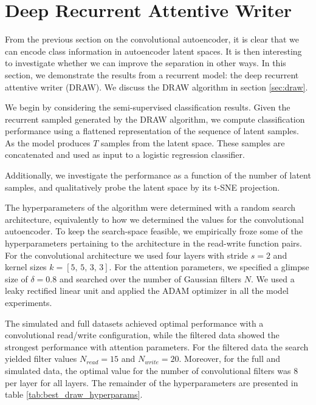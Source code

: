 \section{Deep Recurrent Attentive Writer }

From the previous section on the convolutional autoencoder, it is clear that we can encode class information in autoencoder latent spaces. It is then interesting to investigate whether we can improve the separation in other ways. In this section, we demonstrate the results from a recurrent model: the deep recurrent attentive writer (DRAW). We discuss the DRAW algorithm in section \ref{sec:draw}.

We begin by considering the semi-supervised classification results. Given the recurrent sampled generated by the DRAW algorithm, we compute classification performance using a flattened representation of the sequence of latent samples. As the model produces $T$ samples from the latent space. These samples are concatenated and used as input to a logistic regression classifier.

Additionally, we investigate the performance as a function of the number of latent samples, and qualitatively probe the latent space by its t-SNE projection.

The hyperparameters of the algorithm were determined with a random search architecture, equivalently to how we determined the values for the convolutional autoencoder. To keep the search-space feasible, we empirically froze some of the hyperparameters pertaining to the architecture in the read-write function pairs. For the convolutional architecture we used four layers with stride $s=2$ and kernel sizes $k= [5,\, 5,\, 3,\, 3]$. For the attention parameters, we specified a glimpse size of $\delta=0.8$ and searched over the number of Gaussian filters $N$. We used a leaky rectified linear unit and applied the ADAM optimizer in all the model experiments.

The simulated and full datasets achieved optimal performance with a convolutional read/write configuration, while the filtered data showed the strongest performance with attention parameters. For the filtered data the search yielded filter values $N_{read} = 15$ and $N_{write}=20$. Moreover, for the full and simulated data, the optimal value for the number of convolutional filters was $8$ per layer for all layers. The remainder of the hyperparameters are presented in table \ref{tab:best_draw_hyperparams}.


